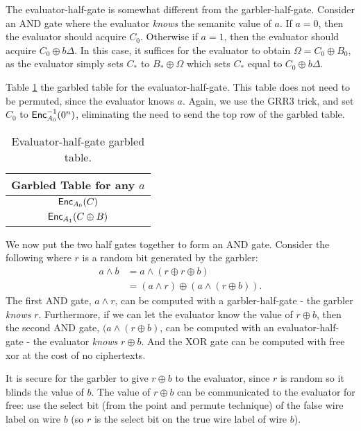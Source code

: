 The evaluator-half-gate is somewhat different from the garbler-half-gate.
Consider an AND gate where the evaluator \textit{knows} the semanitc value of $a$.
If $a = 0$, then the evaluator should acquire $C_0$. 
Otherwise if $a = 1$, then the evaluator should acquire $C_0 \oplus b\Delta$.
In this case, it suffices for the evaluator to obtain $\Omega = C_0 \oplus B_0$, as the evaluator simply sets $C_*$ to $B_* \oplus \Omega$ which sets $C_*$ equal to $C_0 \oplus b\Delta$.

Table \ref{tbl:halfgate-gg-eval} the garbled table for the evaluator-half-gate.
This table does not need to be permuted, since the evaluator knows $a$.
Again, we use the GRR3 trick, and set $C_0$ to $\textsf{Enc}^{-1}_{A_0}(0^n)$, eliminating the need to send the top row of the garbled table.

\begin{table}[h]
    \label{tbl:halfgate-gg-eval}
    \centering
    \begin{tabular}{|c|}
        \hline
        Garbled Table for any $a$ \\
        \hline
        $\textsf{Enc}_{A_0}(C)$ \\
        $\textsf{Enc}_{A_1}(C \oplus B)$ \\
        \hline
    \end{tabular}
    \caption{Evaluator-half-gate garbled table.}
\end{table}

We now put the two half gates together to form an AND gate. 
Consider the following where $r$ is a random bit generated by the garbler:
\begin{align}
    a \wedge b & = a \wedge (r \oplus r \oplus b) \\
               & = (a \wedge r) \oplus (a \wedge (r \oplus b)).
\end{align}
The first AND gate, $a \wedge r$, can be computed with a garbler-half-gate - the garbler \textit{knows} $r$. 
Furthermore, if we can let the evaluator know the value of $r \oplus b$, then the second AND gate, $(a \wedge (r \oplus b)$, can be computed with an evaluator-half-gate - the evaluator \textit{knows} $r \oplus b$. 
And the XOR gate can be computed with free xor at the cost of no ciphertexts. 

It is secure for the garbler to give $r \oplus b$ to the evaluator, since $r$ is random so it blinds the value of $b$. 
The value of $r \oplus b$ can be communicated to the evaluator for free: use the select bit (from the point and permute technique) of the false wire label on wire $b$ (so $r$ is the select bit on the true wire label of wire $b$).

